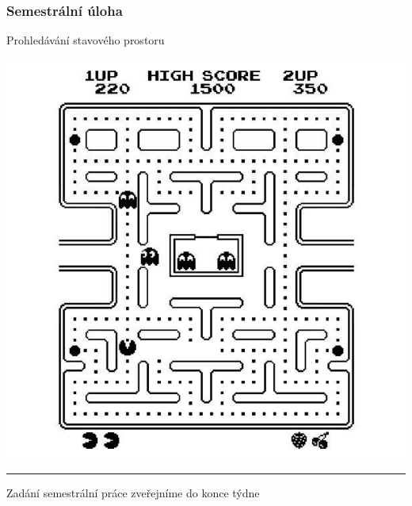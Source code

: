 \documentclass[usenames,dvipsnames,9pt]{beamer}
\begin{document}
\begin{frame}
  \frametitle{Semestrální úloha}
  \begin{center}
    \Large Prohledávání stavového prostoru
  \end{center}
  
    \vspace{1em}
  
  \begin{center}
  \includegraphics[width=.4\linewidth]{07/figs/pacman2.pdf}
  \end{center}
  
%

  \vspace{2em}\pause

  \hrule
  \begin{center}
    Zadání semestrální práce zveřejníme do konce týdne
  \end{center}
\end{frame}

\framefeedback{}
\end{document}
